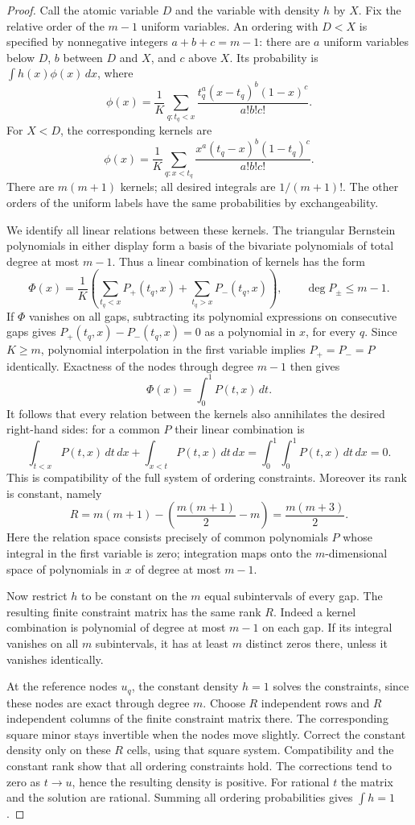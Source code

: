 \documentclass[11pt]{article}
\begin{document}
\begin{proof}
Call the atomic variable $D$ and the variable with density $h$ by $X$.
Fix the relative order of the $m-1$ uniform variables.
An ordering with $D<X$ is specified by nonnegative integers
$a+b+c=m-1$: there are $a$ uniform variables below $D$, $b$ between
$D$ and $X$, and $c$ above $X$. Its probability is $\int h(x)\phi(x)\,dx$,
where
\[
 \phi(x)=\frac1K\sum_{q:t_q<x}
 \frac{t_q^a(x-t_q)^b(1-x)^c}{a!b!c!}.
\]
For $X<D$, the corresponding kernels are
\[
 \phi(x)=\frac1K\sum_{q:x<t_q}
 \frac{x^a(t_q-x)^b(1-t_q)^c}{a!b!c!}.
\]
There are $m(m+1)$ kernels; all desired integrals are
$1/(m+1)!$. The other orders of the uniform labels have the same
probabilities by exchangeability.

We identify all linear relations between these kernels.
The triangular Bernstein polynomials in either display form a basis
of the bivariate polynomials of total degree at most $m-1$.
Thus a linear combination of kernels has the form
\[
 \Phi(x)=\frac1K\left(
   \sum_{t_q<x}P_+(t_q,x)+\sum_{t_q>x}P_-(t_q,x)\right),
 \qquad \deg P_\pm\le m-1.
\]
If $\Phi$ vanishes on all gaps, subtracting its polynomial expressions
on consecutive gaps gives
$P_+(t_q,x)-P_-(t_q,x)=0$ as a polynomial in $x$, for every $q$.
Since $K\ge m$, polynomial interpolation in the first variable implies
$P_+=P_-=P$ identically. Exactness of the nodes through degree $m-1$
then gives
\[
 \Phi(x)=\int_0^1P(t,x)\,dt.
\]
It follows that every relation between the kernels also annihilates
the desired right-hand sides: for a common $P$ their linear combination
is
\[
 \int_{t<x}P(t,x)\,dt\,dx+
 \int_{x<t}P(t,x)\,dt\,dx
 =\int_0^1\int_0^1P(t,x)\,dt\,dx=0.
\]
This is compatibility of the full system of ordering constraints.
Moreover its rank is constant, namely
\[
 R=m(m+1)-\left(\frac{m(m+1)}2-m\right)
   =\frac{m(m+3)}2.
\]
Here the relation space consists precisely of common polynomials $P$
whose integral in the first variable is zero; integration maps onto the
$m$-dimensional space of polynomials in $x$ of degree at most $m-1$.

Now restrict $h$ to be constant on the $m$ equal subintervals of every
gap. The resulting finite constraint matrix has the same rank $R$.
Indeed a kernel combination is polynomial of degree at most $m-1$ on
each gap. If its integral vanishes on all $m$ subintervals, it has at
least $m$ distinct zeros there, unless it vanishes identically.

At the reference nodes $u_q$, the constant density $h=1$ solves the
constraints, since these nodes are exact through degree $m$.
Choose $R$ independent rows and $R$ independent columns of the finite
constraint matrix there. The corresponding square minor stays
invertible when the nodes move slightly. Correct the constant density
only on these $R$ cells, using that square system.
Compatibility and the constant rank show that all ordering constraints
hold. The corrections tend to zero as $t\to u$, hence the resulting
density is positive. For rational $t$ the matrix and the solution are
rational. Summing all ordering probabilities gives $\int h=1$.
\end{proof}
\end{document}

